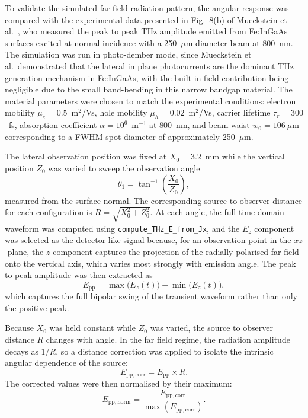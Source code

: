 \documentclass[12pt]{final_project_report}
\begin{document}
To validate the simulated far field radiation pattern, the angular response was compared with the experimental data presented in Fig.~8(b) of Mueckstein et al.~\cite{Mueckstein2015}, who measured the peak to peak THz amplitude emitted from Fe:InGaAs surfaces excited at normal incidence with a 250~$\mu$m-diameter beam at 800~nm. The simulation was run in photo-dember mode, since Mueckstein et al.\ demonstrated that the lateral in plane photocurrents are the dominant THz generation mechanism in Fe:InGaAs, with the built-in field contribution being negligible due to the small band-bending in this narrow bandgap material. The material parameters were chosen to match the experimental conditions: electron mobility $\mu_e = 0.5$~m$^2$/Vs, hole mobility $\mu_h = 0.02$~m$^2$/Vs, carrier lifetime $\tau_r = 300$~fs, absorption coefficient $\alpha = 10^6$~m$^{-1}$ at 800~nm, and beam waist $w_0 = 106~\mu$m corresponding to a FWHM spot diameter of approximately 250~$\mu$m.

The lateral observation position was fixed at $X_0 = 3.2$~mm while the vertical position $Z_0$ was varied to sweep the observation angle
\begin{equation}
    \theta_1 = \tan^{-1}\!\left(\frac{X_0}{Z_0}\right),
\end{equation}
measured from the surface normal. The corresponding source to observer distance for each configuration is $R = \sqrt{X_0^2 + Z_0^2}$. At each angle, the full time domain waveform was computed using \texttt{compute\_THz\_E\_from\_Jx}, and the $E_z$ component was selected as the detector like signal because, for an observation point in the $xz$-plane, the $z$-component captures the projection of the radially polarised far-field onto the vertical axis, which varies most strongly with emission angle. The peak to peak amplitude was then extracted as
\begin{equation}
    E_{\mathrm{pp}} = \max\bigl(E_z(t)\bigr) - \min\bigl(E_z(t)\bigr),
\end{equation}
which captures the full bipolar swing of the transient waveform rather than only the positive peak.

Because $X_0$ was held constant while $Z_0$ was varied, the source to observer distance $R$ changes with angle. In the far field regime, the radiation amplitude decays as $1/R$, so a distance correction was applied to isolate the intrinsic angular dependence of the source:
\begin{equation}
    E_{\mathrm{pp,corr}} = E_{\mathrm{pp}} \times R.
\end{equation}
The corrected values were then normalised by their maximum:
\begin{equation}
    E_{\mathrm{pp,norm}} = \frac{E_{\mathrm{pp,corr}}}{\max(E_{\mathrm{pp,corr}})}.
\end{equation}
\end{document}
